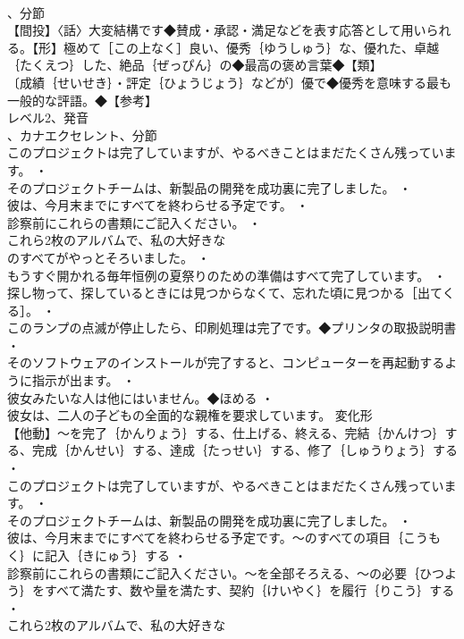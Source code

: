 \documentclass[8pt]{extreport}
\begin{document}
\begin{CJK}{UTF8}{min}
\\	、分節
\\	【間投】〈話〉大変結構です◆賛成・承認・満足などを表す応答として用いられる。【形】極めて［この上なく］良い、優秀｛ゆうしゅう｝な、優れた、卓越｛たくえつ｝した、絶品｛ぜっぴん｝の◆最高の褒め言葉◆【類】 
\\	〔成績｛せいせき｝・評定｛ひょうじょう｝などが〕優で◆優秀を意味する最も一般的な評語。◆【参考】
\\	レベル2、発音
\\	、カナエクセレント、分節
\\	このプロジェクトは完了していますが、やるべきことはまだたくさん残っています。 ・
\\	そのプロジェクトチームは、新製品の開発を成功裏に完了しました。 ・
\\	彼は、今月末までにすべてを終わらせる予定です。 ・
\\	診察前にこれらの書類にご記入ください。 ・
\\	これら2枚のアルバムで、私の大好きな
\\	のすべてがやっとそろいました。 ・
\\	もうすぐ開かれる毎年恒例の夏祭りのための準備はすべて完了しています。 ・
\\	探し物って、探しているときには見つからなくて、忘れた頃に見つかる［出てくる］。 ・
\\	このランプの点滅が停止したら、印刷処理は完了です。◆プリンタの取扱説明書 ・
\\	そのソフトウェアのインストールが完了すると、コンピューターを再起動するように指示が出ます。 ・
\\	彼女みたいな人は他にはいません。◆ほめる ・
\\	彼女は、二人の子どもの全面的な親権を要求しています。	変化形 
\\	【他動】～を完了｛かんりょう｝する、仕上げる、終える、完結｛かんけつ｝する、完成｛かんせい｝する、達成｛たっせい｝する、修了｛しゅうりょう｝する ・
\\	このプロジェクトは完了していますが、やるべきことはまだたくさん残っています。 ・
\\	そのプロジェクトチームは、新製品の開発を成功裏に完了しました。 ・
\\	彼は、今月末までにすべてを終わらせる予定です。～のすべての項目｛こうもく｝に記入｛きにゅう｝する ・
\\	診察前にこれらの書類にご記入ください。～を全部そろえる、～の必要｛ひつよう｝をすべて満たす、数や量を満たす、契約｛けいやく｝を履行｛りこう｝する ・
\\	これら2枚のアルバムで、私の大好きな

\end{CJK}
\end{document}
